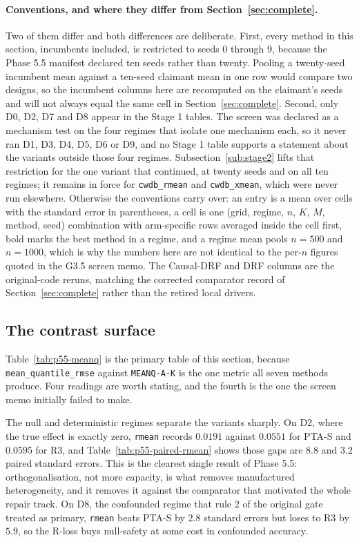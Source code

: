 \paragraph{Conventions, and where they differ from Section~\ref{sec:complete}.}
Two of them differ and both differences are deliberate. First, every method in
this section, incumbents included, is restricted to seeds 0 through 9, because
the Phase 5.5 manifest declared ten seeds rather than twenty. Pooling a
twenty-seed incumbent mean against a ten-seed claimant mean in one row would
compare two designs, so the incumbent columns here are recomputed on the
claimant's seeds and will not always equal the same cell in
Section~\ref{sec:complete}. Second, only D0, D2, D7 and D8 appear in the Stage 1
tables. The screen was declared as a mechanism test on the four regimes that
isolate one mechanism each, so it never ran D1, D3, D4, D5, D6 or D9, and no
Stage 1 table supports a statement about the variants outside those four
regimes. Subsection~\ref{sub:stage2} lifts that restriction for the one variant
that continued, at twenty seeds and on all ten regimes; it remains in force for
\texttt{cwdb\_rmean} and \texttt{cwdb\_xmean}, which were never run elsewhere.
Otherwise the conventions carry over: an entry is a mean over cells with the
standard error in parentheses, a cell is one (grid, regime, $n$, $K$, $M$,
method, seed) combination with arm-specific rows averaged inside the cell first,
bold marks the best method in a regime, and a regime mean pools $n = 500$ and
$n = 1000$, which is why the numbers here are not identical to the per-$n$
figures quoted in the G3.5 screen memo. The Causal-DRF and DRF columns are the
original-code reruns, matching the corrected comparator record of
Section~\ref{sec:complete} rather than the retired local drivers.

\subsection{The contrast surface}

Table~\ref{tab:p55-meanq} is the primary table of this section, because
\texttt{mean\_quantile\_rmse} against \texttt{MEANQ-A-K} is the one metric all
seven methods produce. Four readings are worth stating, and the fourth is the
one the screen memo initially failed to make.

The null and deterministic regimes separate the variants sharply. On D2, where
the true effect is exactly zero, \texttt{rmean} records $0.0191$ against
$0.0551$ for PTA-S and $0.0595$ for R3, and Table~\ref{tab:p55-paired-rmean}
shows those gaps are $8.8$ and $3.2$ paired standard errors. This is the
clearest single result of Phase 5.5: orthogonalisation, not more capacity, is
what removes manufactured heterogeneity, and it removes it against the
comparator that motivated the whole repair track. On D8, the confounded regime
that rule 2 of the original gate treated as primary, \texttt{rmean} beats PTA-S
by $2.8$ standard errors but loses to R3 by $5.9$, so the R-loss buys
null-safety at some cost in confounded accuracy.

